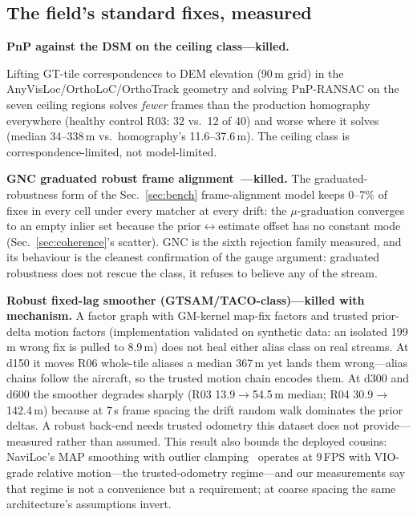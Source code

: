 \documentclass[journal]{IEEEtran}
\begin{document}
\subsection{The field's standard fixes, measured}
\label{sec:fixes}

\textbf{PnP against the DSM on the ceiling class---killed.} {\sloppy
Lifting GT-tile correspondences to DEM elevation (90\,m grid) in the AnyVisLoc/OrthoLoC/OrthoTrack geometry and solving PnP-RANSAC on the seven ceiling regions solves \emph{fewer} frames than the production homography everywhere (healthy control R03: 32 vs.\ 12 of 40) and worse where it solves (median 34--338\,m vs.\ homography's 11.6--37.6\,m). The ceiling class is correspondence-limited, not model-limited.\par}

\textbf{GNC graduated robust frame alignment~\cite{yang2020}---killed.} The graduated-robustness form of the Sec.~\ref{sec:bench} frame-alignment model keeps 0--7\% of fixes in every cell under every matcher at every drift: the $\mu$-graduation converges to an empty inlier set because the prior$\leftrightarrow$estimate offset has no constant mode (Sec.~\ref{sec:coherence}'s scatter). GNC is the sixth rejection family measured, and its behaviour is the cleanest confirmation of the gauge argument: graduated robustness does not rescue the class, it refuses to believe any of the stream.

\textbf{Robust fixed-lag smoother (GTSAM/TACO-class)---killed with mechanism.} A factor graph with GM-kernel map-fix factors and trusted prior-delta motion factors (implementation validated on synthetic data: an isolated 199\,m wrong fix is pulled to 8.9\,m) does not heal either alias class on real streams. At d150 it moves R06 whole-tile aliases a median 367\,m yet lands them wrong---alias chains follow the aircraft, so the trusted motion chain encodes them. At d300 and d600 the smoother degrades sharply (R03 13.9$\to$54.5\,m median; R04 30.9$\to$142.4\,m) because at 7\,s frame spacing the drift random walk dominates the prior deltas. A robust back-end needs trusted odometry this dataset does not provide---measured rather than assumed. This result also bounds the deployed cousins: NaviLoc's MAP smoothing with outlier clamping~\cite{naviloc} operates at 9\,FPS with VIO-grade relative motion---the trusted-odometry regime---and our measurements say that regime is not a convenience but a requirement; at coarse spacing the same architecture's assumptions invert.
\end{document}
